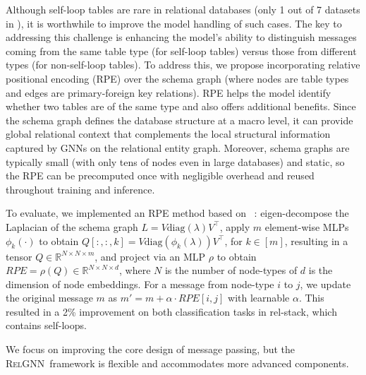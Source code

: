 \documentclass{article}
\newcommand{\method}{\textsc{RelGNN}}
\theoremstyle{plain}
\theoremstyle{definition}
\theoremstyle{remark}
\begin{document}
\label{self-loop}
 Although self-loop tables are rare in relational databases (only 1 out of 7 datasets in \relbench), it is worthwhile to improve the model handling of such cases. The key to addressing this challenge is enhancing the model's ability to distinguish messages coming from the same table type (for self-loop tables) versus those from different types (for non-self-loop tables). To address this, we propose incorporating relative positional encoding (RPE) over the schema graph (where nodes are table types and edges are primary-foreign key relations). RPE helps the model identify whether two tables are of the same type and also offers additional benefits. Since the schema graph defines the database structure at a macro level, it can provide global relational context that complements the local structural information captured by GNNs on the relational entity graph. Moreover, schema graphs are typically small (with only tens of nodes even in large databases) and static, so the RPE can be precomputed once with negligible overhead and reused throughout training and inference.

 To evaluate, we implemented an RPE method based on ~\citet{huangstability}: eigen-decompose the Laplacian of the schema graph $L=V\text{diag}(\lambda)V^{\top}$, apply $m$ element-wise MLPs $\phi_k(\cdot)$ to obtain $Q[:,:,k]=V\text{diag}(\phi_k(\lambda))V^{\top}$, for $k\in[m]$, resulting in a tensor $Q\in\mathbb{R}^{N\times N\times m}$, and project via an MLP $\rho$ to obtain $RPE=\rho(Q)\in\mathbb{R}^{N\times N\times d}$, where $N$ is the number of node-types of $d$ is the dimension of node embeddings. For a message from node-type $i$ to $j$, we update the original message $m$ as $m' = m + \alpha \cdot RPE[i, j]$ with learnable $\alpha$. This resulted in a 2\% improvement on both classification tasks in rel-stack, which contains self-loops.

We focus on improving the core design of message passing, but the \method~framework is flexible and accommodates more advanced components.
\end{document}
